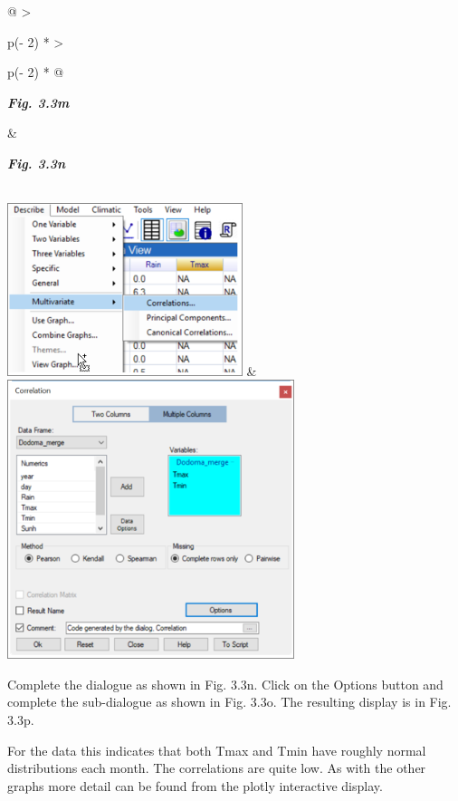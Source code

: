 \documentclass[
  letterpaper,
  DIV=11,
  numbers=noendperiod]{scrreprt}
\begin{document}
\begin{longtable}[]{@{}
  >{\raggedright\arraybackslash}p{(\columnwidth - 2\tabcolsep) * }
  >{\raggedright\arraybackslash}p{(\columnwidth - 2\tabcolsep) * }@{}}
\toprule\noalign{}
\begin{minipage}[b]{\linewidth}\raggedright
\textbf{\emph{Fig. 3.3m}}
\end{minipage} & \begin{minipage}[b]{\linewidth}\raggedright
\textbf{\emph{Fig. 3.3n}}
\end{minipage} \\
\midrule\noalign{}
\endhead
\bottomrule\noalign{}
\endlastfoot
\includegraphics[width=2.70613in,height=1.98484in]{figures/Fig3.3m.png}
&
\includegraphics[width=3.30684in,height=3.20808in]{figures/Fig3.3n.png} \\
\end{longtable}

Complete the dialogue as shown in Fig. 3.3n. Click on the Options button
and complete the sub-dialogue as shown in Fig. 3.3o. The resulting
display is in Fig. 3.3p.

For the data this indicates that both Tmax and Tmin have roughly normal
distributions each month. The correlations are quite low. As with the
other graphs more detail can be found from the plotly interactive
display.
\end{document}
